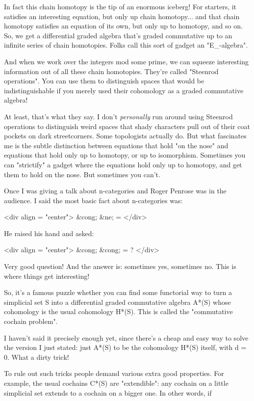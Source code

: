 In fact this chain homotopy is the tip of an enormous iceberg!  For
starters, it satisfies an interesting equation, but only up chain
homotopy...  and that chain homotopy satisfies an equation of its own,
but only up to homotopy, and so on.  So, we get a differential graded
algebra that's graded commutative up to an infinite series of chain
homotopies.  Folks call this sort of gadget an
"E_{\infty }-algebra".

And when we work over the integers mod some prime, we can squeeze
interesting information out of all these chain homotopies.  They're
called "Steenrod operations".  You can use them to distinguish spaces
that would be indistinguishable if you merely used their cohomology as
a graded commutative algebra!

At least, that's what they say.  I don't \emph{personally} run
around using Steenrod operations to distinguish weird spaces 
that shady characters pull out of their coat pockets on dark
streetcorners.  Some topologists actually do.  But what fascinates me
is the subtle distinction between equations that hold "on the
nose" and equations that hold only up to homotopy, or up to
isomorphism.  Sometimes you can "strictify" a gadget where
the equations hold only up to homotopy, and get them to hold on the
nose.  But sometimes you can't.

Once I was giving a talk about n-categories and Roger Penrose was
in the audience.  I said the most basic fact about n-categories was:

<div align = "center">
          &cong; &ne; =
</div>

He raised his hand and asked:

<div align = "center">
          &cong; &cong; = ?
</div>

Very good question!  And the answer is: sometimes yes, sometimes no.
This is where things get interesting!

So, it's a famous puzzle whether you can find some functorial way to 
turn a simplicial set S into a differential graded commutative algebra
A*(S) whose cohomology is the usual cohomology H*(S).  This is called the 
"commutative cochain problem".

I haven't said it precisely enough yet, since there's a cheap and easy
way to solve the version I just stated: just A*(S) to be the cohomology
H*(S) itself, with d = 0.  What a dirty trick!

To rule out such tricks people demand various extra good properties.  
For example, the usual cochains C*(S) are "extendible": any cochain
on a little simplicial set extends to a cochain on a bigger one.  
In other words, if 

